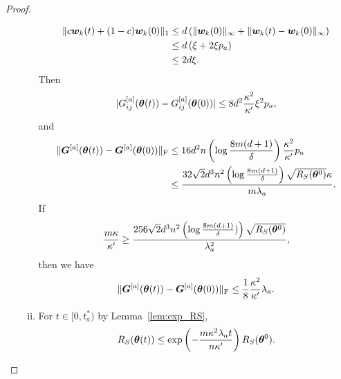 \documentclass[twoside,11pt]{article}
\begin{document}
\begin{proof}
\begin{enumerate}[(a)]
\begin{enumerate}[(i)]
\begin{equation*}
\begin{aligned}
                                \lVert c\bm{w}_k(t) + (1-c)\bm{w}_k(0)\rVert_1
                                 & \leq d\left(\lVert\bm{w}_k(0)\rVert_{\infty} + \lVert\bm{w}_k(t) - \bm{w}_k(0)\rVert_{\infty}\right) \\
                                 & \leq d\left(\xi+2\xi p_a\right)                                                   \\
                                 & \leq 2d\xi.
                            \end{aligned}
                        \end{equation*}
                        Then
                        \begin{equation*}
                            \lvert G_{ij}^{[a]}(\bm{\theta}(t)) - G_{ij}^{[a]}(\bm{\theta}(0))\rvert \leq 8d^2\frac{\kappa^2}{\kappa'}\xi^2p_a,
                        \end{equation*}
                        and
                        \begin{equation*}
                            \begin{aligned}
                                \lVert\bm{G}^{[a]}(\bm{\theta}(t)) - \bm{G}^{[a]}(\bm{\theta}(0))\rVert_\mathrm{F}
                                 & \leq 16d^2n\left(\log\frac{8m(d+1)}{\delta}\right)\frac{\kappa^2}{\kappa'}p_a                              \\
                                 & \leq\frac{32\sqrt{2}d^3n^2\left(\log\frac{8m(d+1)}{\delta}\right)\sqrt{R_S(\bm{\theta}^0)}\kappa}{m\lambda_a}.
                            \end{aligned}
                        \end{equation*}
                        If
                        \begin{equation*}
                            \frac{m\kappa}{\kappa'}\geq\frac{256\sqrt{2}d^3n^2\left(\log\frac{8m(d+1)}{\delta})\right)\sqrt{R_S(\bm{\theta}^0)}}{\lambda_a^2},
                        \end{equation*}
                        then we have
                        \begin{equation}\label{thm-proof:w-step1}
                            \lVert\bm{G}^{[a]}(\bm{\theta}(t)) - \bm{G}^{[a]}(\bm{\theta}(0))\rVert_\mathrm{F}\leq\frac{1}{8}\frac{\kappa^2}{\kappa'}\lambda_a.
                        \end{equation}
                  \item For $t\in[0,t^*_a)$ by Lemma~\ref{lem:exp_RS},
                        \begin{equation*}
                            \RS(\vtheta(t))\leq\exp\left(-\frac{m\kappa^2\lambda_at}{n\kappa'}\right)\RS(\vtheta^0).

\end{equation*}
\end{enumerate}
\end{enumerate}
\end{proof}
\end{document}
